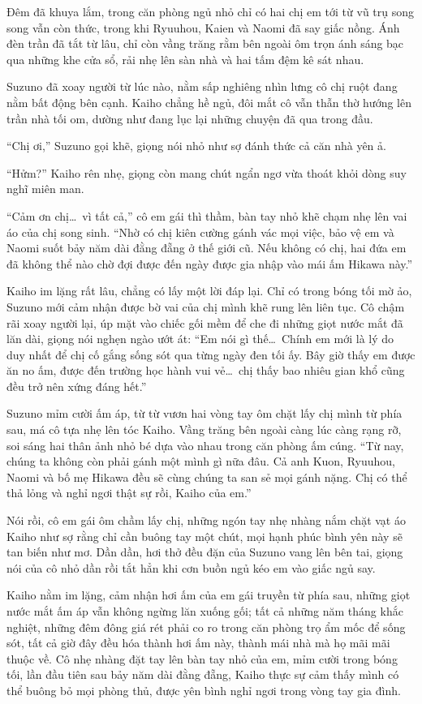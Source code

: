 \documentclass[../main.tex]{subfiles}
\begin{document}
Đêm đã khuya lắm, trong căn phòng ngủ nhỏ chỉ có hai chị em tới từ vũ trụ song song vẫn còn thức, trong khi Ryuuhou, Kaien và Naomi đã say giấc nồng. Ánh đèn trần đã tắt từ lâu, chỉ còn vầng trăng rằm bên ngoài ôm trọn ánh sáng bạc qua những khe cửa sổ, rải nhẹ lên sàn nhà và hai tấm đệm kê sát nhau.

Suzuno đã xoay người từ lúc nào, nằm sấp nghiêng nhìn lưng cô chị ruột đang nằm bất động bên cạnh. Kaiho chẳng hề ngủ, đôi mắt cô vẫn thẫn thờ hướng lên trần nhà tối om, dường như đang lục lại những chuyện đã qua trong đầu.

``Chị ơi,'' Suzuno gọi khẽ, giọng nói nhỏ như sợ đánh thức cả căn nhà yên ả.

``Hửm?'' Kaiho rên nhẹ, giọng còn mang chút ngẩn ngơ vừa thoát khỏi dòng suy nghĩ miên man.

``Cảm ơn chị\dots\ vì tất cả,'' cô em gái thì thầm, bàn tay nhỏ khẽ chạm nhẹ lên vai áo của chị song sinh. ``Nhờ có chị kiên cường gánh vác mọi việc, bảo vệ em và Naomi suốt bảy năm dài đằng đẵng ở thế giới cũ. Nếu không có chị, hai đứa em đã không thể nào chờ đợi được đến ngày được gia nhập vào mái ấm Hikawa này.''

Kaiho im lặng rất lâu, chẳng có lấy một lời đáp lại. Chỉ có trong bóng tối mờ ảo, Suzuno mới cảm nhận được bờ vai của chị mình khẽ rung lên liên tục. Cô chậm rãi xoay người lại, úp mặt vào chiếc gối mềm để che đi những giọt nước mắt đã lăn dài, giọng nói nghẹn ngào ướt át: ``Em nói gì thế\dots\ Chính em mới là lý do duy nhất để chị cố gắng sống sót qua từng ngày đen tối ấy. Bây giờ thấy em được ăn no ấm, được đến trường học hành vui vẻ\dots\ chị thấy bao nhiêu gian khổ cũng đều trở nên xứng đáng hết.''

Suzuno mỉm cười ấm áp, từ từ vươn hai vòng tay ôm chặt lấy chị mình từ phía sau, má cô tựa nhẹ lên tóc Kaiho. Vầng trăng bên ngoài càng lúc càng rạng rỡ, soi sáng hai thân ảnh nhỏ bé dựa vào nhau trong căn phòng ấm cúng. ``Từ nay, chúng ta không còn phải gánh một mình gì nữa đâu. Cả anh Kuon, Ryuuhou, Naomi và bố mẹ Hikawa đều sẽ cùng chúng ta san sẻ mọi gánh nặng. Chị có thể thả lỏng và nghỉ ngơi thật sự rồi, Kaiho của em.''

Nói rồi, cô em gái ôm chầm lấy chị, những ngón tay nhẹ nhàng nắm chặt vạt áo Kaiho như sợ rằng chỉ cần buông tay một chút, mọi hạnh phúc bình yên này sẽ tan biến như mơ. Dần dần, hơi thở đều đặn của Suzuno vang lên bên tai, giọng nói của cô nhỏ dần rồi tắt hẳn khi cơn buồn ngủ kéo em vào giấc ngủ say. 

Kaiho nằm im lặng, cảm nhận hơi ấm của em gái truyền từ phía sau, những giọt nước mắt ấm áp vẫn không ngừng lăn xuống gối; tất cả những năm tháng khắc nghiệt, những đêm đông giá rét phải co ro trong căn phòng trọ ẩm mốc để sống sót, tất cả giờ đây đều hóa thành hơi ấm này, thành mái nhà mà họ mãi mãi thuộc về. Cô nhẹ nhàng đặt tay lên bàn tay nhỏ của em, mỉm cười trong bóng tối, lần đầu tiên sau bảy năm dài đằng đẵng, Kaiho thực sự cảm thấy mình có thể buông bỏ mọi phòng thủ, được yên bình nghỉ ngơi trong vòng tay gia đình.
\end{document}
